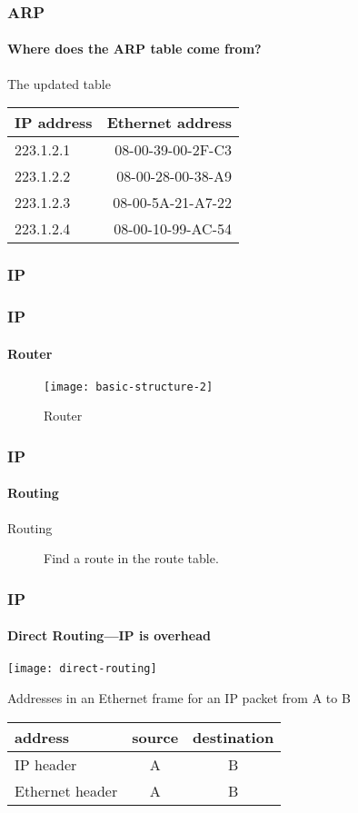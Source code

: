 \documentclass[hyperref={xetex,colorlinks,linkcolor=blue},green,compress]{beamer}
\begin{document}
  \begin{frame}
    \frametitle{ARP} \framesubtitle{Where does the ARP table come from?}
    \begin{exampleblock}{The updated table}
      \begin{center}
        \begin{tabular}{|lr|}
          \hline
          IP address & Ethernet address\\\hline
          223.1.2.1 & 08-00-39-00-2F-C3\\
          223.1.2.2 & 08-00-28-00-38-A9\\
          223.1.2.3 & 08-00-5A-21-A7-22\\
          223.1.2.4 & 08-00-10-99-AC-54\\\hline
        \end{tabular}
      \end{center}
    \end{exampleblock}
  \end{frame}


  \subsubsection{IP}

  \begin{frame}
    \frametitle{IP} \framesubtitle{Router}
    \begin{figure}
      \centering
      \texttt{[image: basic-structure-2]}
      \caption{Router}
      \label{fig:router}
    \end{figure}
  \end{frame}

  \begin{frame}
    \frametitle{IP} \framesubtitle{Routing}
    \begin{description}
    \item[Routing] Find a route in the route table.
    \end{description}
  \end{frame}

  \begin{frame}
    \frametitle{IP} \framesubtitle{Direct Routing---IP is overhead}
    \begin{center}
      \texttt{[image: direct-routing]}
    \end{center}

    \begin{exampleblock}{Addresses in an Ethernet frame for an IP
        packet from A to B}
      \begin{center}
      \begin{tabular}{|lcc|}
        \hline
        address & source & destination\\\hline
        IP header & A & B\\
        Ethernet header & A & B\\\hline
      \end{tabular}
      \end{center}
    \end{exampleblock}
  \end{frame}
\end{document}

